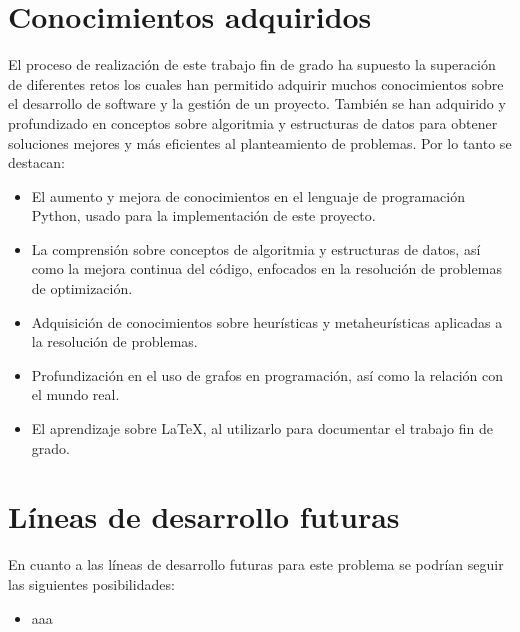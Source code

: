 
\section{Conocimientos adquiridos}

El proceso de realización de este trabajo fin de grado ha supuesto la superación de diferentes retos los cuales han permitido adquirir muchos conocimientos sobre el desarrollo de software y la gestión de un proyecto. También se han adquirido y profundizado en conceptos sobre algoritmia y estructuras de datos para obtener soluciones mejores y más eficientes al planteamiento de problemas. Por lo tanto se destacan:

\begin{itemize}
  \item El aumento y mejora de conocimientos en el lenguaje de programación Python, usado para la implementación de este proyecto.
  \item La comprensión sobre conceptos de algoritmia y estructuras de datos, así como la mejora continua del código, enfocados en la resolución de problemas de optimización.
  \item Adquisición de conocimientos sobre heurísticas y metaheurísticas aplicadas a la resolución de problemas.
  \item Profundización en el uso de grafos en programación, así como la relación con el mundo real.
  \item El aprendizaje sobre \LaTeX, al utilizarlo para documentar el trabajo fin de grado.
\end{itemize}

\section{Líneas de desarrollo futuras}
En cuanto a las líneas de desarrollo futuras para este problema se podrían seguir las siguientes posibilidades:

\begin{itemize}
	\item aaa
\end{itemize}

